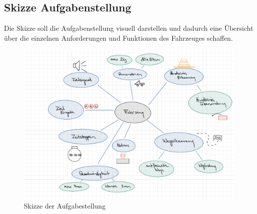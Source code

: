 \documentclass[../main.tex]{subfiles}
\begin{document}
\newpage
\subsection{Skizze Aufgabenstellung}
Die Skizze soll die Aufgabenstellung visuell darstellen und dadurch eine  Übersicht über die einzelnen Anforderungen und Funktionen des Fahrzeuges schaffen.
    \begin{figure}[H]
        \includegraphics[width=\textwidth]{assets/Skizze_Aufgabenstellung.pdf}
        \caption{Skizze der Aufgabestellung}
        \label{img:Skizze_Aufgabenstellung}
    \end{figure} 
 
\end{document}
